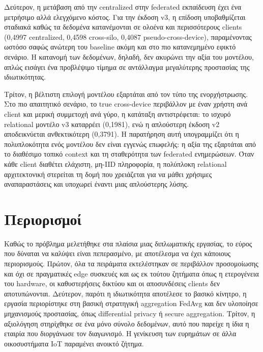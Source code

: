 Δεύτερον, η μετάβαση από την centralized στην federated εκπαίδευση έχει ένα μετρήσιμο αλλά ελεγχόμενο κόστος. Για την έκδοση v3, η επίδοση υποβαθμίζεται σταδιακά καθώς τα δεδομένα κατανέμονται σε ολοένα και περισσότερους clients (0,4997 centralized, 0,4598 cross-silo, 0,4087 pseudo-cross-device), παραμένοντας ωστόσο σαφώς ανώτερη του baseline ακόμη και στο πιο κατανεμημένο εφικτό σενάριο. Η κατανομή των δεδομένων, δηλαδή, δεν ακυρώνει την αξία του μοντέλου, απλώς εισάγει ένα προβλέψιμο τίμημα σε αντάλλαγμα μεγαλύτερης προστασίας της ιδιωτικότητας.

Τρίτον, η βέλτιστη επιλογή μοντέλου εξαρτάται από τον τύπο της ενορχήστρωσης. Στο πιο απαιτητικό σενάριο, το true cross-device περιβάλλον με έναν χρήστη ανά client και μερική συμμετοχή ανά γύρο, η κατάταξη αντιστρέφεται: το ισχυρό relational μοντέλο v3 καταρρέει (0,1981), ενώ η απλούστερη έκδοση v2 αποδεικνύεται ανθεκτικότερη (0,3791). Η παρατήρηση αυτή υπογραμμίζει ότι η πολυπλοκότητα ενός μοντέλου δεν είναι εγγενώς επωφελής: η αξία της εξαρτάται από το διαθέσιμο τοπικό context και τη σταθερότητα των federated ενημερώσεων. Όταν κάθε client διαθέτει ελάχιστη, μη-IID πληροφορία, η πολύπλοκη relational αρχιτεκτονική στερείται τη δομή που χρειάζεται για να μάθει χρήσιμες αναπαραστάσεις και υποχωρεί έναντι μιας απλούστερης λύσης.

\section{Περιορισμοί}\label{sec:concl-limitations}
Καθώς το πρόβλημα μελετήθηκε στα πλαίσια μιας διπλωματικής εργασίας, το εύρος που δύναται να καλύψει είναι πεπερασμένο, με αποτέλεσμα να έχει κάποιους περιορισμούς. Πρώτον, όλα τα πειράματα εκτελέστηκαν σε περιβάλλον προσομοίωσης και όχι σε πραγματικές edge συσκευές και ως εκ τούτου ζητήματα όπως η ετερογένεια του hardware, οι καθυστερήσεις δικτύου και οι αποσυνδέσεις clients δεν αποτυπώνονται. Δεύτερον, παρότι η ιδιωτικότητα αποτέλεσε το βασικό κίνητρο, η εργασία περιορίστηκε στη βασική στρατηγική aggregation FedAvg και δεν υλοποίησε μηχανισμούς προστασίας, όπως differential privacy ή secure aggregation. Τρίτον, η αξιολόγηση στηρίχθηκε σε ένα μόνο σύνολο δεδομένων, αυτό που παρείχε η ίδια η εταιρία που διοργάνωσε τον διαγωνισμό. Η γενίκευση των ευρημάτων σε άλλα οικοσυστήματα IoT παραμένει ανοικτό ζήτημα.

